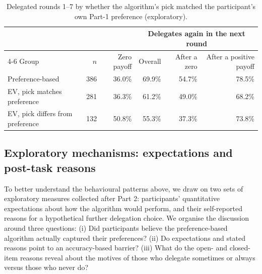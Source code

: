 \documentclass[a4paper, 12pt, fleqn]{article}
\theoremstyle{hypstyle}
\begin{document}
\begin{table}[tbp]
\centering
\caption{Delegated rounds 1--7 by whether the algorithm's pick matched the participant's own Part-1 preference (exploratory).}
\label{tab:mismatch}
\footnotesize
\begin{tabular}{lrrrrr}
\toprule
 & & & \multicolumn{3}{c}{Delegates again in the next round} \\
\cmidrule(lr){4-6}
Group & $n$ & Zero payoff & Overall & After a zero & After a positive payoff \\
\midrule
Preference-based & 386 & 36.0\% & 69.9\% & 54.7\% & 78.5\% \\
EV, pick matches preference & 281 & 36.3\% & 61.2\% & 49.0\% & 68.2\% \\
EV, pick differs from preference & 132 & 50.8\% & 55.3\% & 37.3\% & 73.8\% \\
\bottomrule
\end{tabular}
\end{table}



\subsection{Exploratory mechanisms: expectations and post-task reasons}
\label{sec:exploratory_mechanisms}
To better understand the behavioural patterns above, we draw on two sets of exploratory measures collected after Part 2: participants' quantitative expectations about how the algorithm would perform, and their self-reported reasons for a hypothetical further delegation choice. We organise the discussion around three questions: (i) Did participants believe the preference-based algorithm actually captured their preferences? (ii) Do expectations and stated reasons point to an accuracy-based barrier? (iii) What do the open- and closed-item reasons reveal about the motives of those who delegate sometimes or always versus those who never do?
\end{document}
